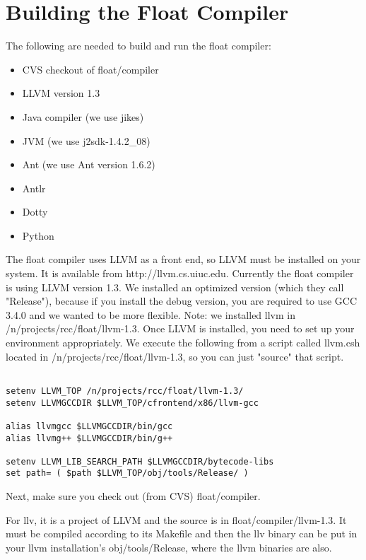 \section{Building the Float Compiler}

The following are needed to build and run the float compiler:
\begin{itemize}
\item CVS checkout of float/compiler
\item LLVM version 1.3
\item Java compiler (we use jikes)
\item JVM (we use j2sdk-1.4.2\_08)
\item Ant (we use Ant version 1.6.2)
\item Antlr  
\item Dotty
\item Python
\end{itemize}

The float compiler uses LLVM as a front end, so LLVM must be installed on your system.  It is available from http://llvm.cs.uiuc.edu.  Currently the float compiler is using LLVM version 1.3.  We installed an optimized version (which they call "Release"), because if you install the debug version, you are required to use GCC 3.4.0 and we wanted to be more flexible. Note: we installed llvm in /n/projects/rcc/float/llvm-1.3.  Once LLVM is installed, you need to set up your environment appropriately.  We execute the following from a script called llvm.csh located in /n/projects/rcc/float/llvm-1.3, so you can just "source" that script.

\begin{verbatim}

setenv LLVM_TOP /n/projects/rcc/float/llvm-1.3/
setenv LLVMGCCDIR $LLVM_TOP/cfrontend/x86/llvm-gcc

alias llvmgcc $LLVMGCCDIR/bin/gcc
alias llvmg++ $LLVMGCCDIR/bin/g++

setenv LLVM_LIB_SEARCH_PATH $LLVMGCCDIR/bytecode-libs
set path= ( $path $LLVM_TOP/obj/tools/Release/ )

\end{verbatim}


Next, make sure you check out (from CVS) float/compiler.  

For llv, it is a project of LLVM and the source is in float/compiler/llvm-1.3.  It must be compiled according to its Makefile and then the llv binary can be put in your llvm installation's obj/tools/Release, where the llvm binaries are also.


